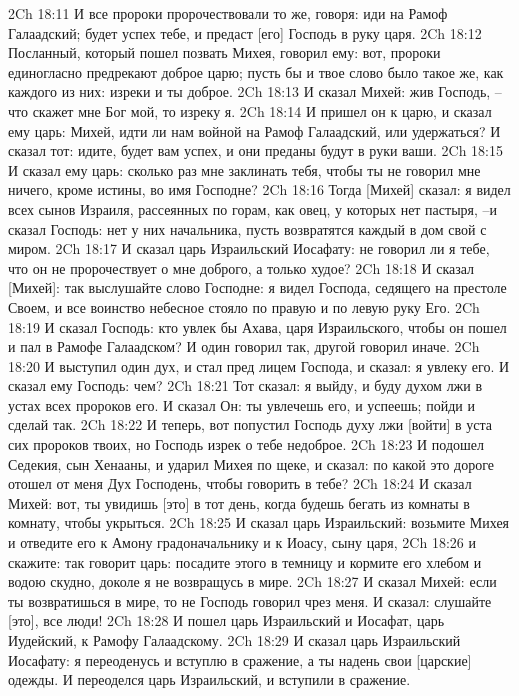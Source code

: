 2Ch 18:11  И все пророки пророчествовали то же, говоря: иди на Рамоф Галаадский; будет успех тебе, и предаст [его] Господь в руку царя.
2Ch 18:12  Посланный, который пошел позвать Михея, говорил ему: вот, пророки единогласно предрекают доброе царю; пусть бы и твое слово было такое же, как каждого из них: изреки и ты доброе.
2Ch 18:13  И сказал Михей: жив Господь, --что скажет мне Бог мой, то изреку я.
2Ch 18:14  И пришел он к царю, и сказал ему царь: Михей, идти ли нам войной на Рамоф Галаадский, или удержаться? И сказал тот: идите, будет вам успех, и они преданы будут в руки ваши.
2Ch 18:15  И сказал ему царь: сколько раз мне заклинать тебя, чтобы ты не говорил мне ничего, кроме истины, во имя Господне?
2Ch 18:16  Тогда [Михей] сказал: я видел всех сынов Израиля, рассеянных по горам, как овец, у которых нет пастыря, --и сказал Господь: нет у них начальника, пусть возвратятся каждый в дом свой с миром.
2Ch 18:17  И сказал царь Израильский Иосафату: не говорил ли я тебе, что он не пророчествует о мне доброго, а только худое?
2Ch 18:18  И сказал [Михей]: так выслушайте слово Господне: я видел Господа, седящего на престоле Своем, и все воинство небесное стояло по правую и по левую руку Его.
2Ch 18:19  И сказал Господь: кто увлек бы Ахава, царя Израильского, чтобы он пошел и пал в Рамофе Галаадском? И один говорил так, другой говорил иначе.
2Ch 18:20  И выступил один дух, и стал пред лицем Господа, и сказал: я увлеку его. И сказал ему Господь: чем?
2Ch 18:21  Тот сказал: я выйду, и буду духом лжи в устах всех пророков его. И сказал Он: ты увлечешь его, и успеешь; пойди и сделай так.
2Ch 18:22  И теперь, вот попустил Господь духу лжи [войти] в уста сих пророков твоих, но Господь изрек о тебе недоброе.
2Ch 18:23  И подошел Седекия, сын Хенааны, и ударил Михея по щеке, и сказал: по какой это дороге отошел от меня Дух Господень, чтобы говорить в тебе?
2Ch 18:24  И сказал Михей: вот, ты увидишь [это] в тот день, когда будешь бегать из комнаты в комнату, чтобы укрыться.
2Ch 18:25  И сказал царь Израильский: возьмите Михея и отведите его к Амону градоначальнику и к Иоасу, сыну царя,
2Ch 18:26  и скажите: так говорит царь: посадите этого в темницу и кормите его хлебом и водою скудно, доколе я не возвращусь в мире.
2Ch 18:27  И сказал Михей: если ты возвратишься в мире, то не Господь говорил чрез меня. И сказал: слушайте [это], все люди!
2Ch 18:28  И пошел царь Израильский и Иосафат, царь Иудейский, к Рамофу Галаадскому.
2Ch 18:29  И сказал царь Израильский Иосафату: я переоденусь и вступлю в сражение, а ты надень свои [царские] одежды. И переоделся царь Израильский, и вступили в сражение.
